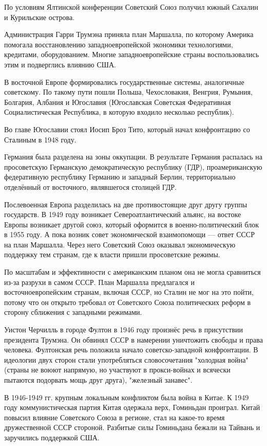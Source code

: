 \documentclass{article}
\begin{document}
По условиям Ялтинской конференции Советский Союз получил южный Сахалин и Курильские острова. 

Администрация Гарри Трумэна приняла план Маршалла, по которому Америка помогала восстановлению западноевропейской экономики технологиями, кредитами, оборудованием. Многие западноевропейские страны воспользовались этим и подверглись влиянию США.

В восточной Европе формировались государственные системы, аналогичные советскому. По такому пути пошли Польша, Чехословакия, Венгрия, Румыния, Болгария, Албания и Югославия (Югославская Советская Федеративная Социалистическая Республика, в которую входило несколько республик).

Во главе Югославии стоял Иосип Броз Тито, который начал конфронтацию со Сталиным в 1948 году.

Германия была разделена на зоны оккупации. В результате Германия распалась на просоветскую Германскую демократическую республику (ГДР), проамериканскую федеративную республику Германию и западный Берлин, территориально отделённый от восточного, являвшегося столицей ГДР.

Послевоенная Европа разделилась на две противостоящие друг другу группы государств. В 1949 году возникает Североатлантический альянс, на востоке Европы возникает другой союз, который оформится в военно-политический блок в 1955 году. А пока возник совет экономической взаимопомощи --- ответ СССР на план Маршалла. Через него Советский Союз оказывал экономическую поддержку тем странам, где к власти пришли просоветские режимы.

По масштабам и эффективности с американским планом она не могла сравниться из-за разрухи в самом СССР. План Маршалла предлагался и восточноевропейским странам, включая СССР, но Сталин не мог на это пойти, потому что он открыто требовал от Советского Союза политических реформ в сторону сближения с западными режимами.

Уистон Черчилль в городе Фултон в 1946 году произнёс речь в присутствии президента Трумэна. Он обвинял СССР в намерении уничтожить свободы и права человека. Фултонская речь положила начало советско-западной конфронтации. В идеологии двух сторон стали употребляться словосочетания "холодная война" (страны не воюют напрямую, но участвуют в прокси-войнах и всячески пытаются подорвать мощь друг друга), "железный занавес".

В 1946-1949 гг. крупным локальным конфликтом была война в Китае. К 1949 году коммунистическая партия Китая одержала верх, Гоминьдан проиграл. Китай повысил влияние Советского Союза в регионе, стал на какое-то время дружественной СССР стороной. Разбитые силы Гоминьдана бежали на Тайвань и заручились поддержкой США.
\end{document}
